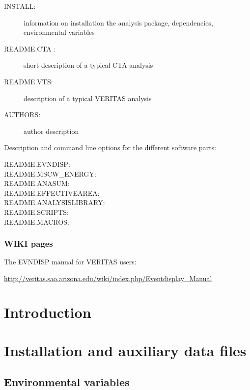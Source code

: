 \documentclass[titlepage,a4paper,twoside,11pt]{report}
\newcommand{\clearemptydoublepage}{\newpage{\pagestyle{empty}\cleardoublepage}}
\begin{document}
\begin{description}
\item[INSTALL:]   information on installation the analysis package, dependencies, environmental variables
\item[README.CTA :]  short description of a typical CTA analysis
\item[README.VTS:]      description of a typical VERITAS analysis
\item[AUTHORS:]		author description
\end{description}

\noindent Description and command line options for the different software parts:

\begin{description}
\item[README.EVNDISP:]
\item[README.MSCW\_ENERGY:]
\item[README.ANASUM:]
\item[README.EFFECTIVEAREA:]
\item[README.ANALYSISLIBRARY:]
\item[README.SCRIPTS:]
\item[README.MACROS:]
\end{description}

\subsection*{WIKI pages}

The EVNDISP manual for VERITAS users: 

\url{http://veritas.sao.arizona.edu/wiki/index.php/Eventdisplay\_Manual}

\clearemptydoublepage

\chapter{Introduction}

%
%

\chapter{Installation and auxiliary data files}

\section{Environmental variables}
\label{SECTION.ENVIRON}
\end{document}
